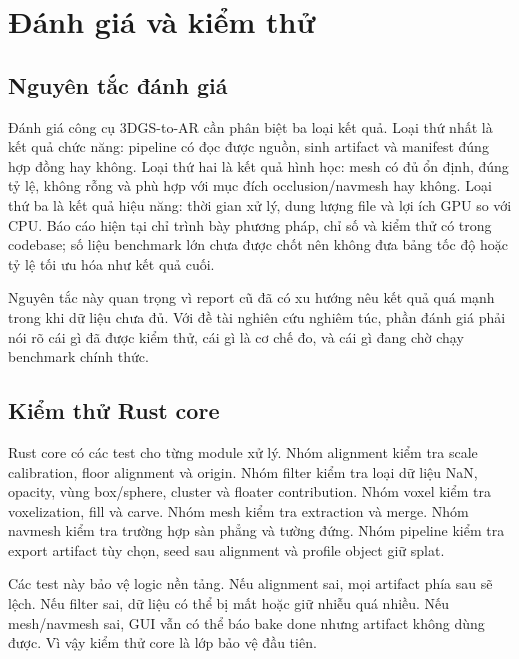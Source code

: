 \section{Đánh giá và kiểm thử}

\subsection{Nguyên tắc đánh giá}

Đánh giá công cụ 3DGS-to-AR cần phân biệt ba loại kết quả. Loại thứ nhất là kết quả chức năng: pipeline có đọc được nguồn, sinh artifact và manifest đúng hợp đồng hay không. Loại thứ hai là kết quả hình học: mesh có đủ ổn định, đúng tỷ lệ, không rỗng và phù hợp với mục đích occlusion/navmesh hay không. Loại thứ ba là kết quả hiệu năng: thời gian xử lý, dung lượng file và lợi ích GPU so với CPU. Báo cáo hiện tại chỉ trình bày phương pháp, chỉ số và kiểm thử có trong codebase; số liệu benchmark lớn chưa được chốt nên không đưa bảng tốc độ hoặc tỷ lệ tối ưu hóa như kết quả cuối.

Nguyên tắc này quan trọng vì report cũ đã có xu hướng nêu kết quả quá mạnh trong khi dữ liệu chưa đủ. Với đề tài nghiên cứu nghiêm túc, phần đánh giá phải nói rõ cái gì đã được kiểm thử, cái gì là cơ chế đo, và cái gì đang chờ chạy benchmark chính thức.

\subsection{Kiểm thử Rust core}

Rust core có các test cho từng module xử lý. Nhóm alignment kiểm tra scale calibration, floor alignment và origin. Nhóm filter kiểm tra loại dữ liệu NaN, opacity, vùng box/sphere, cluster và floater contribution. Nhóm voxel kiểm tra voxelization, fill và carve. Nhóm mesh kiểm tra extraction và merge. Nhóm navmesh kiểm tra trường hợp sàn phẳng và tường đứng. Nhóm pipeline kiểm tra export artifact tùy chọn, seed sau alignment và profile object giữ splat.

Các test này bảo vệ logic nền tảng. Nếu alignment sai, mọi artifact phía sau sẽ lệch. Nếu filter sai, dữ liệu có thể bị mất hoặc giữ nhiễu quá nhiều. Nếu mesh/navmesh sai, GUI vẫn có thể báo bake done nhưng artifact không dùng được. Vì vậy kiểm thử core là lớp bảo vệ đầu tiên.


